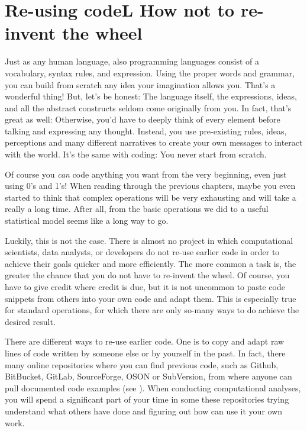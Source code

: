 \section{Re-using codeL How not to re-invent the wheel}
\label{sec:code}

Just as any human language, also programming languages consist of a vocabulary, syntax rules, and expression. Using the proper words and grammar, you can build from scratch any idea your imagination allows you. That's a wonderful thing! But, let's be honest: The language itself, the expressions, ideas, and all the abstract constructs seldom come originally from you. In fact, that's great as well: Otherwise, you'd have to deeply think of every element before talking and expressing any thought. Instead, you use pre-existing rules, ideas, perceptions and many different narratives to create your own messages to interact with the world. It's the same with coding: You never start from scratch.

Of course you \emph{can} code anything you want from the very beginning, even just using 0's and 1's!
When reading through the previous chapters, maybe you even started to think that complex operations will be very exhausting and will take a really a long time. After all, from the basic operations we did to a useful statistical model seems like a long way to go.

Luckily, this is not the case.
There is almost no project in which computational scientists, data analysts, or developers do not re-use earlier code in order to achieve their goals quicker and more efficiently.
The more common a task is, the greater the chance that you do not have to re-invent the wheel.
Of course, you have to give credit where credit is due, but it is not uncommon to paste code snippets from others into your own code and adapt them. This is especially true for standard operations, for which there are only so-many ways to do achieve the desired result.

There are different ways to re-use earlier code. One is to copy and adapt raw lines of code written by someone else or by yourself in the past. In fact, there many online repositories where you can find previous code, such as Github, BitBucket, GitLab, SourceForge, OSON or SubVersion, from where anyone can pull documented code examples (see ). When conducting computational analyses, you will spend a significant part of your time in some these repositories trying understand what others have done and figuring out how can use it your own work.

